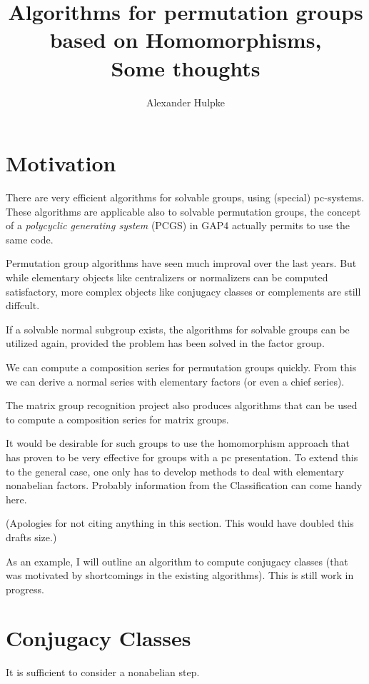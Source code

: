\documentclass[11pt]{amsart}
\title{Algorithms for permutation groups based on
Homomorphisms,\\
Some thoughts}
\author{Alexander Hulpke}
\begin{document}
\maketitle
\pagestyle{empty}
\thispagestyle{empty}
\section{Motivation}

There are very efficient algorithms for solvable groups, using (special)
pc-systems. These algorithms are applicable also to solvable permutation
groups, the concept of a {\em polycyclic generating system} ({\sf PCGS}) in
{\sf GAP4} actually permits to use the same code.

Permutation group algorithms have seen much improval over the last years.
But while elementary objects like centralizers or normalizers can be computed
satisfactory, more complex objects like conjugacy classes or complements
are still diffcult.

If a solvable normal subgroup exists, the algorithms for solvable groups can
be utilized again, provided the problem has been solved in the factor group. 

We can compute a composition series for permutation groups quickly. From
this we can derive a normal series with elementary factors (or even a chief
series).

The matrix group recognition project also produces algorithms that can be
used to compute a composition series for matrix groups. 

It would be desirable for such groups to use the homomorphism approach
that has proven to be very effective for groups with a pc presentation.
To extend this to the general case, one only has
to develop methods to deal with elementary nonabelian factors. Probably
information from the Classification can come handy here.

(Apologies for not citing anything in this section. This would have doubled
this drafts size.)

As an example, I will outline an algorithm to compute conjugacy classes (that
was motivated by shortcomings in the existing algorithms).
This is still work in progress.

\section{Conjugacy Classes}

It is sufficient to consider a nonabelian step.
\end{document}
